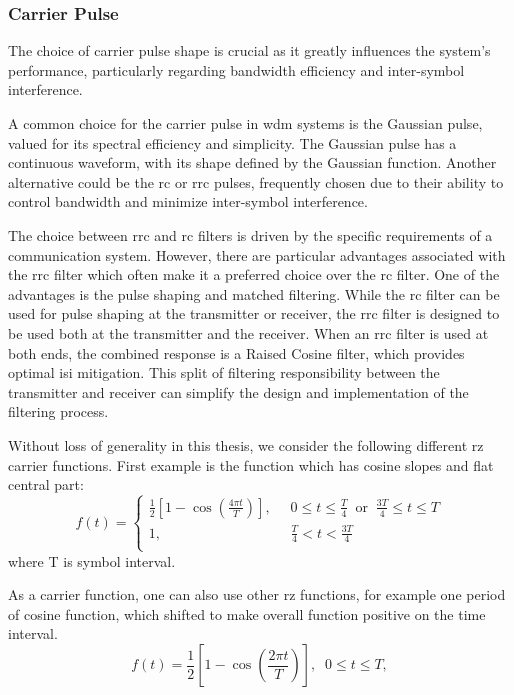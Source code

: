 \subsubsection{Carrier Pulse}
The choice of carrier pulse shape is crucial as it greatly influences the system's performance, particularly regarding bandwidth efficiency and inter-symbol interference.

A common choice for the carrier pulse in \acrshort{wdm} systems is the Gaussian pulse, valued for its spectral efficiency and simplicity. The Gaussian pulse has a continuous waveform, with its shape defined by the Gaussian function. Another alternative could be the \gls{rc} or \gls{rrc} pulses, frequently chosen due to their ability to control bandwidth and minimize inter-symbol interference.

The choice between \Gls{rrc} and \Gls{rc} filters is driven by the specific requirements of a communication system. However, there are particular advantages associated with the \Gls{rrc} filter which often make it a preferred choice over the \Gls{rc} filter. One of the advantages is the pulse shaping and matched filtering. While the \Gls{rc} filter can be used for pulse shaping at the transmitter or receiver, the \Gls{rrc} filter is designed to be used both at the transmitter and the receiver. When an \Gls{rrc} filter is used at both ends, the combined response is a Raised Cosine filter, which provides optimal \acrshort{isi} mitigation. This split of filtering responsibility between the transmitter and receiver can simplify the design and implementation of the filtering process.


Without loss of generality in this thesis, we consider the following different \acrfull{rz} carrier functions. First example is the function which has cosine slopes and flat central part:
\begin{equation}
    f(t)=
    \left\{
        \begin{aligned}
        \frac{1}{2}\left[1 - \cos\left(\frac{4\pi t}{T}\right)\right] {,} & \; \; 0 \le t \le \frac{T}{4} \; \; \text{or} \; \; \frac{3T}{4} \le t \le T \\
        1 {,} & \; \; \frac{T}{4} < t < \frac{3T}{4} \\
        \end{aligned}
    \right.
    \label{eq:wdm_carrier}
\end{equation}
where {T} is symbol interval.

As a carrier function, one can also use other \acrshort{rz} functions, for example one period of cosine function, which shifted to make overall function positive on the time interval.
\begin{equation}
    f(t)=
    \frac{1}{2}\left[1 - \cos\left(\frac{2\pi t}{T}\right)\right] {,} \; \; 0 \le t \le T {,} 
    \label{eq:wdm_carrier2}
\end{equation}



